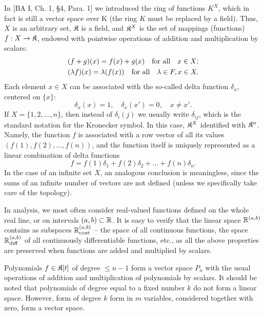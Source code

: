 \begin{example}
	In [BA I, Ch. 1, \S4, Para. 1] we introduced the ring of functions $K^X$, which in fact is still a vector space over K (the ring $K$ must be replaced by a field). Thus, $X$ is an arbitrary set, ${\mathfrak{K}}$ is a field, and ${{\mathfrak{K}}}^X$ is the set of mappings (functions) $f: X\to {\mathfrak{K}}$, endowed with pointwise operations of addition and multiplication by scalars:
\begin{align*}
(f+g)(x) = f(x)+g(x) \text{\quad for all\quad} x\in X;\\
(\lambda f)(x) = \lambda (f(x)) \text{\quad for all\quad} \lambda\in F, x\in X.
\end{align*}
Each element $x\in X$ can be associated with the so-called delta function $\delta_x$, centered on $\{x\}$:
\[\delta_x(x) = 1, \quad \delta_x(x') = 0, \quad x\ne x'.\]
If $X = \{1, 2,\dots, n\}$, then instead of $\delta_i (j)$ we usually write $\delta_{ij}$, which is the standard notation for the Kronecker symbol. In this case, ${{\mathfrak{K}}}^X$ identified with ${{\mathfrak{K}}}^n$. Namely, the function $f$ is associated with a row vector of all its values $(f(1),f(2),\dots ,f(n))$, and the function itself is uniquely represented as a linear combination of delta functions
\[f = f(1)\delta_1 + f(2)\delta_2 + \dots + f(n)\delta_n.\]
In the case of an infinite set $X$, an analogous conclusion is meaningless, since the sums of an infinite number of vectors are not defined (unless we specifically take care of the topology).

In analysis, we most often consider real-valued functions defined on the whole real line, or on intervals $(a, b)\subset {\mathbb{R}}$. It is easy to verify that the linear space ${\mathbb{R}}^{(a,b)}$ contains as subspaces ${\mathbb{R}}_{\mathrm{cont}}^{(a,b)}$ -- the space of all continuous functions, the space ${\mathbb{R}}_{\mathrm{diff}}^{(a,b)}$ of all continuously differentiable functions, etc., as all the above properties are preserved when functions are added and multiplied by scalars.
\end{example}

\begin{example}
	Polynomials $f\in {\mathfrak{K}} [t]$ of degree $\le n-1$ form a vector space $P_n$ with the usual operations of addition and multiplication of polynomials by scalars. It should be noted that polynomials of degree equal to a fixed number $k$ do not form a linear space. However, form of degree $k$ form in $m$ variables, considered together with zero, form a vector space. 
\end{example}

